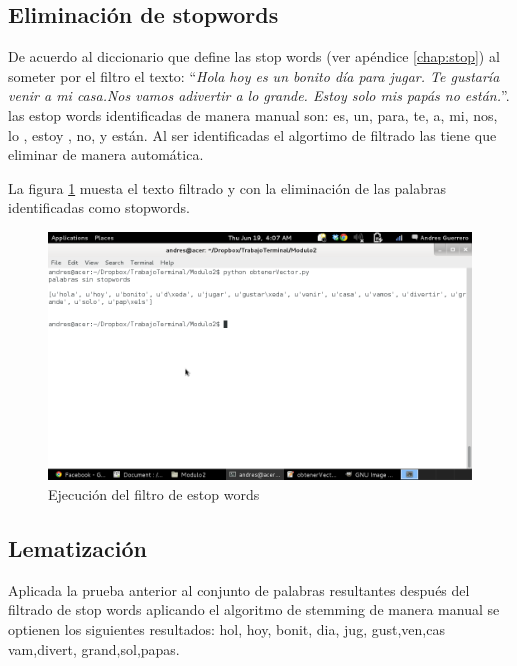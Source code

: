 \subsection{Eliminaci\'on de stopwords}
De acuerdo al diccionario que define las stop words (ver ap\'endice \ref{chap:stop}) al someter por el filtro el texto: ``\textit{Hola hoy es un bonito d\'ia para jugar. Te gustar\'ia venir a mi casa.Nos vamos adivertir a lo grande. Estoy solo mis pap\'as no est\'an.}''. las estop words identificadas de manera manual son: es, un, para, te, a, mi, nos, lo , estoy , no, y est\'an.
Al ser identificadas el algortimo de filtrado las tiene que eliminar de manera autom\'atica.

La figura \ref{elimina_stops} muesta el texto filtrado y con la eliminaci\'on de las palabras identificadas como stopwords.

\begin{figure}
	\begin{center}
		\includegraphics[scale=.4]{images/stopw}
	\end{center}
	 \caption{Ejecuci\'on del filtro de estop words}
	 \label{elimina_stops}
\end{figure}

\subsection{Lematizaci\'on}

Aplicada la prueba anterior al conjunto de palabras resultantes despu\'es del filtrado de stop words aplicando el algoritmo de stemming de manera manual se optienen los siguientes resultados: hol, hoy, bonit, dia, jug, gust,ven,cas vam,divert, grand,sol,papas.

